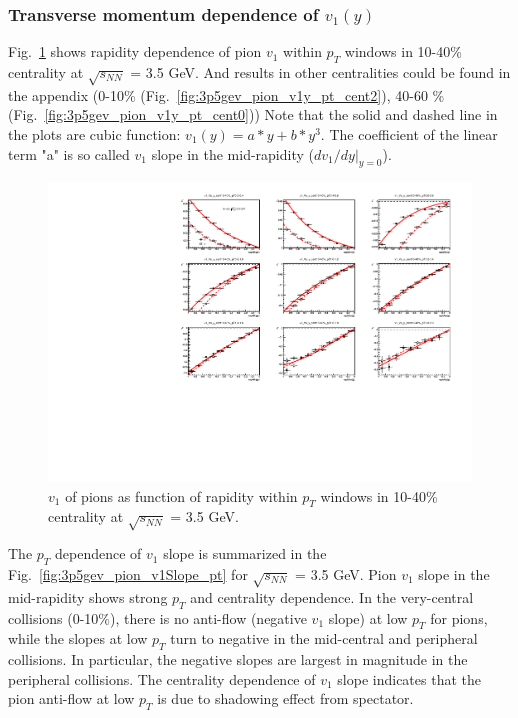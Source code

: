 \subsubsection{Transverse momentum dependence of $v_1(y)$}

Fig.~\ref{fig:3p5gev_pion_v1y_pt_cent1} shows rapidity dependence of pion $v_1$ within $p_T$ windows in 10-40\% centrality at $\sqrt{s_{NN}}$ = 3.5 GeV.
And results in other centralities could be found in the appendix (0-10\% (Fig.~\ref{fig:3p5gev_pion_v1y_pt_cent2}), 40-60 \%(Fig.~\ref{fig:3p5gev_pion_v1y_pt_cent0}))
Note that the solid and dashed line in the plots are cubic function: $v_1(y) = a*y + b*y^3$. 
The coefficient of the linear term "a" is so called $v_1$ slope in the mid-rapidity ($dv_1/dy|_{y=0}$).

\begin{figure}[hbt!]
\centering
\includegraphics[width=0.85\linewidth]{figures/chapter03/3p5gev_pionp_v1VSy_9pT_cent1.pdf}
\caption{$v_1$ of pions as function of rapidity within $p_T$ windows in 10-40\% centrality at $\sqrt{s_{NN}}$ = 3.5 GeV.}
\label{fig:3p5gev_pion_v1y_pt_cent1}
\end{figure}

The $p_T$ dependence of $v_1$ slope is summarized in the Fig.~\ref{fig:3p5gev_pion_v1Slope_pt} for $\sqrt{s_{NN}}$ = 3.5 GeV.
Pion $v_1$ slope in the mid-rapidity shows strong $p_T$ and centrality dependence. 
In the very-central collisions (0-10\%), there is no anti-flow (negative $v_1$ slope) at low $p_T$ for pions, 
while the slopes at low $p_T$ turn to negative in the mid-central and peripheral collisions.
In particular, the negative slopes are largest in magnitude in the peripheral collisions.
The centrality dependence of $v_1$ slope indicates that the pion anti-flow at low $p_T$ is due to 
shadowing effect from spectator.

